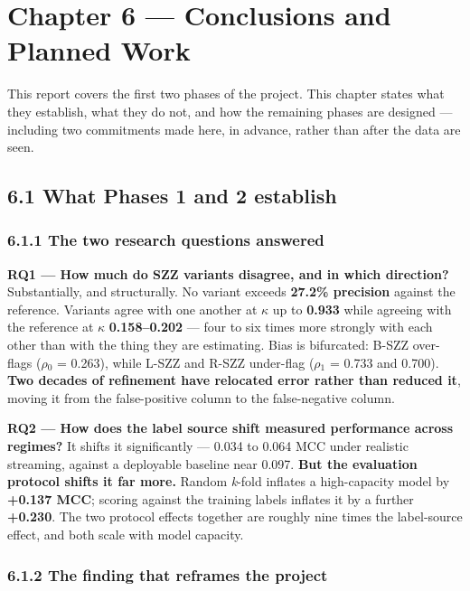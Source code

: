 \chapter{Chapter 6 --- Conclusions and Planned
Work}\label{chapter-6-conclusions-and-planned-work}

This report covers the first two phases of the project. This chapter
states what they establish, what they do not, and how the remaining
phases are designed --- including two commitments made here, in advance,
rather than after the data are seen.

\section{6.1 What Phases 1 and 2
establish}\label{what-phases-1-and-2-establish}

\subsection{6.1.1 The two research questions
answered}\label{the-two-research-questions-answered}

\textbf{RQ1 --- How much do SZZ variants disagree, and in which
direction?} Substantially, and structurally. No variant exceeds
\textbf{27.2\% precision} against the reference. Variants agree with one
another at \ensuremath{\kappa} up to \textbf{0.933} while agreeing with the reference at \ensuremath{\kappa}
\textbf{0.158--0.202} --- four to six times more strongly with each
other than with the thing they are estimating. Bias is bifurcated: B-SZZ
over-flags (\ensuremath{\rho}\ensuremath{_0} = 0.263), while L-SZZ and R-SZZ under-flag (\ensuremath{\rho}\ensuremath{_1} = 0.733
and 0.700). \textbf{Two decades of refinement have relocated error
rather than reduced it}, moving it from the false-positive column to the
false-negative column.

\textbf{RQ2 --- How does the label source shift measured performance
across regimes?} It shifts it significantly --- 0.034 to 0.064 MCC under
realistic streaming, against a deployable baseline near 0.097.
\textbf{But the evaluation protocol shifts it far more.} Random
\emph{k}-fold inflates a high-capacity model by \textbf{+0.137 MCC};
scoring against the training labels inflates it by a further
\textbf{+0.230}. The two protocol effects together are roughly nine
times the label-source effect, and both scale with model capacity.

\subsection{6.1.2 The finding that reframes the
project}\label{the-finding-that-reframes-the-project}


